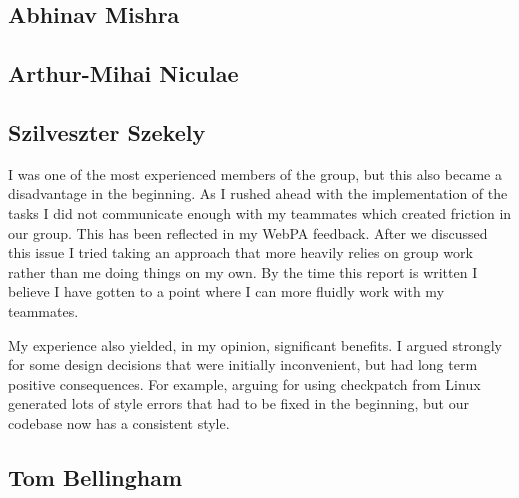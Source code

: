 \documentclass[11pt]{article}
\begin{document}
\subsection{Abhinav Mishra}

\subsection{Arthur-Mihai Niculae}

\subsection{Szilveszter Szekely}

I was one of the most experienced members of the group, but this also became
a disadvantage in the beginning. As I rushed ahead with the implementation of
the tasks I did not communicate enough with my teammates which created friction
in our group. This has been reflected in my WebPA feedback. After we discussed
this issue I tried taking an approach that more heavily relies on group work
rather than me doing things on my own. By the time this report is written
I believe I have gotten to a point where I can more fluidly work with my
teammates.

My experience also yielded, in my opinion, significant benefits. I argued
strongly for some design decisions that were initially inconvenient, but had
long term positive consequences. For example, arguing for using checkpatch from
Linux generated lots of style errors that had to be fixed in the beginning, but
our codebase now has a consistent style.

\subsection{Tom Bellingham}
\end{document}
